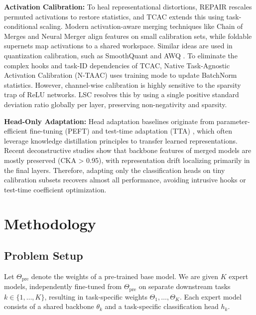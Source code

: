 \documentclass{article}
\theoremstyle{plain}
\theoremstyle{definition}
\theoremstyle{remark}
\begin{document}
\textbf{Activation Calibration:} To heal representational distortions, REPAIR \cite{jordan2022repair} rescales permuted activations to restore statistics, and TCAC extends this using task-conditional scaling. Modern activation-aware merging techniques like Chain of Merges \cite{buzzega2025chain} and Neural Merger \cite{horoi2024neural} align features on small calibration sets, while foldable supernets \cite{kinderman2024foldable} map activations to a shared workspace. Similar ideas are used in quantization calibration, such as SmoothQuant \cite{xiao2023smoothquant} and AWQ \cite{lin2023awq}. To eliminate the complex hooks and task-ID dependencies of TCAC, Native Task-Agnostic Activation Calibration (N-TAAC) uses training mode to update BatchNorm statistics. However, channel-wise calibration is highly sensitive to the sparsity trap of ReLU networks. LSC resolves this by using a single positive standard deviation ratio globally per layer, preserving non-negativity and sparsity.

\textbf{Head-Only Adaptation:} Head adaptation baselines originate from parameter-efficient fine-tuning (PEFT) \cite{houlsby2019parameter, hu2021lora, li2021prefix, lester2021power, zaken2021bitfit} and test-time adaptation (TTA) \cite{wang2021tent, sun2020test, wang2022continual, boudiaf2022parameter}, which often leverage knowledge distillation principles \cite{hinton2015distilling} to transfer learned representations. Recent deconstructive studies show that backbone features of merged models are mostly preserved (CKA > 0.95), with representation drift localizing primarily in the final layers. Therefore, adapting only the classification heads on tiny calibration subsets recovers almost all performance, avoiding intrusive hooks or test-time coefficient optimization.

\section{Methodology}
\subsection{Problem Setup}
Let $\Theta_{\text{pre}}$ denote the weights of a pre-trained base model. We are given $K$ expert models, independently fine-tuned from $\Theta_{\text{pre}}$ on separate downstream tasks $k \in \{1, \dots, K\}$, resulting in task-specific weights $\Theta_1, \dots, \Theta_K$. Each expert model consists of a shared backbone $\theta_k$ and a task-specific classification head $h_k$. 
\end{document}
